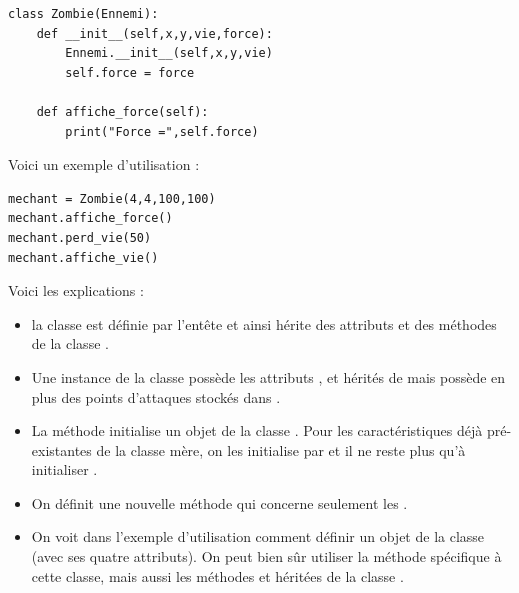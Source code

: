 \documentclass[11pt,class=report,crop=false]{standalone}
\begin{document}
\begin{cours}
\begin{lstlisting}
class Zombie(Ennemi):
    def __init__(self,x,y,vie,force):
        Ennemi.__init__(self,x,y,vie)
        self.force = force

    def affiche_force(self):
        print("Force =",self.force)
\end{lstlisting}

Voici un exemple d'utilisation :

\begin{lstlisting}
mechant = Zombie(4,4,100,100)
mechant.affiche_force()
mechant.perd_vie(50)
mechant.affiche_vie()
\end{lstlisting}

Voici les explications : 
\begin{itemize}
  \item la classe  est définie par l'entête \og{}\fg{} et ainsi hérite des attributs et des méthodes de la classe .
  
  \item Une instance de la classe  possède les attributs ,  et  hérités de  mais possède en plus des points d'attaques stockés dans .
  
  \item La méthode  initialise un objet de la classe . Pour les caractéristiques déjà pré-existantes de la classe mère, on les initialise par  et il ne reste plus qu'à initialiser .
  
  \item On définit une nouvelle méthode  qui concerne seulement les .
  
  \item On voit dans l'exemple d'utilisation comment définir un objet de la classe  (avec ses quatre attributs). On peut bien sûr utiliser la méthode  spécifique à cette classe, mais aussi les méthodes  et  héritées de la classe .

\end{itemize}

\end{cours}

\end{document}
